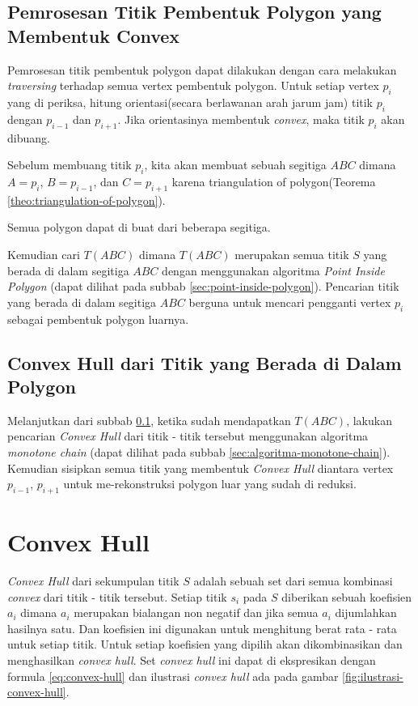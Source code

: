 \subsection{Pemrosesan Titik Pembentuk Polygon yang Membentuk Convex}
\label{sec:pemrosesan-titik-pembentuk-polygon-yang-membentuk-convex}
Pemrosesan titik pembentuk polygon dapat dilakukan dengan cara melakukan \textit{traversing} terhadap semua vertex pembentuk polygon. Untuk setiap vertex $p_i$ yang di periksa, hitung orientasi(secara berlawanan arah jarum jam) titik $p_i$ dengan $p_{i-1}$ dan $ p_{i+1}$. Jika orientasinya membentuk \textit{convex}, maka titik $p_i$ akan dibuang.
\par Sebelum membuang titik $p_i$, kita akan membuat sebuah segitiga $ABC$ dimana $A=p_i$, $B=p_{i-1}$, dan $C=p_{i+1}$ karena triangulation of polygon(Teorema \ref{theo:triangulation-of-polygon}).
\begin{theo}
    \label{theo:triangulation-of-polygon}
	Semua polygon dapat di buat dari beberapa segitiga.
\end{theo}
Kemudian cari $T(ABC)$ dimana $T(ABC)$ merupakan semua titik $S$ yang berada di dalam segitiga $ABC$ dengan menggunakan algoritma \textit{Point Inside Polygon} (dapat dilihat pada subbab \ref{sec:point-inside-polygon}). Pencarian titik yang berada di dalam segitiga $ABC$ berguna untuk mencari pengganti vertex $p_i$ sebagai pembentuk polygon luarnya.

\subsection{Convex Hull dari Titik yang Berada di Dalam Polygon}
\label{sec:convex-hull-dari-titik-yang-berada-di-dalam-polygon}
Melanjutkan dari subbab \ref{sec:pemrosesan-titik-pembentuk-polygon-yang-membentuk-convex}, ketika sudah mendapatkan $T(ABC)$, lakukan pencarian \textit{Convex Hull} dari titik - titik tersebut menggunakan algoritma \textit{monotone chain} (dapat dilihat pada subbab \ref{sec:algoritma-monotone-chain}). Kemudian sisipkan semua titik yang membentuk \textit{Convex Hull} diantara vertex $p_{i-1}$, $p_{i+1}$ untuk me-rekonstruksi polygon luar yang sudah di reduksi.

\section{Convex Hull}
\label{sec:convex-hull}
\textit{Convex Hull} dari sekumpulan titik $S$ adalah sebuah set dari semua kombinasi \textit{convex} dari titik - titik tersebut. Setiap titik $s_i$ pada $S$ diberikan sebuah koefisien $a_i$ dimana $a_i$ merupakan bialangan non negatif dan jika semua $a_i$ dijumlahkan hasilnya satu. Dan koefisien ini digunakan untuk menghitung berat rata - rata untuk setiap titik. Untuk setiap koefisien yang dipilih akan dikombinasikan dan menghasilkan \textit{convex hull}. Set \textit{convex hull} ini dapat di ekspresikan dengan formula \eqref{eq:convex-hull} dan ilustrasi \textit{convex hull} ada pada gambar \ref{fig:ilustrasi-convex-hull}.

